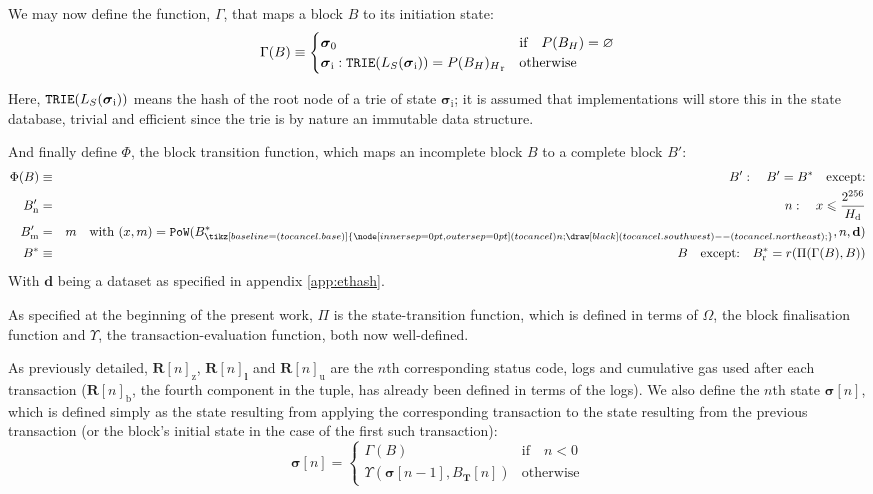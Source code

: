 \documentclass[9pt,oneside]{amsart}
\newcommand{\hcancel}[1]{%
    \tikz[baseline=(tocancel.base)]{
        \node[inner sep=0pt,outer sep=0pt] (tocancel) {#1};
        \draw[black] (tocancel.south west) -- (tocancel.north east);
    }%
}%
\begin{document}
\begin{multicols}{2}
\hypertarget{Gamma}{}We may now define the function, $\Gamma$, that maps a block $B$ to its initiation state:
\begin{equation}
\Gamma(B) \equiv \begin{cases}
\boldsymbol{\sigma}_0 & \text{if} \quad P(B_{H}) = \varnothing \\
\boldsymbol{\sigma}_{\mathrm{i}}: \mathtt{\small TRIE}(L_{S}(\boldsymbol{\sigma}_{\mathrm{i}})) = {P(B_{H})_{H}}_{\mathrm{r}} & \text{otherwise}
\end{cases}
\end{equation}

Here, $\mathtt{\small TRIE}(L_{S}(\boldsymbol{\sigma}_{\mathrm{i}}))$ means the hash of the root node of a trie of state $\boldsymbol{\sigma}_{\mathrm{i}}$; it is assumed that implementations will store this in the state database, trivial and efficient since the trie is by nature an immutable data structure.

\hypertarget{Phi}{}And finally define $\Phi$, the block transition function, which maps an incomplete block $B$ to a complete block $B'$:
\begin{eqnarray}
\Phi(B) & \equiv & B': \quad B' = B^* \quad \text{except:} \\
B'_{\mathrm{n}} & = & n: \quad x \leqslant \frac{2^{256}}{H_{\mathrm{d}}} \\
B'_{\mathrm{m}} & = & m \quad \text{with } (x, m) = \mathtt{PoW}(B^*_{\hcancel{n}}, n, \mathbf{d}) \\
B^* & \equiv & B \quad \text{except:} \quad B^*_{\mathrm{r}} = r(\Pi(\Gamma(B), B))
\end{eqnarray}
With $\mathbf{d}$ being a dataset as specified in appendix \ref{app:ethash}.

As specified at the beginning of the present work, $\Pi$ is the state-transition function, which is defined in terms of $\Omega$, the block finalisation function and \hyperlink{Upsilon_state_transition}{$\Upsilon$}, the transaction-evaluation function, both now well-defined.

As previously detailed, $\mathbf{R}[n]_{\mathrm{z}}$, $\mathbf{R}[n]_{\mathbf{l}}$ and $\mathbf{R}[n]_{\mathrm{u}}$ are the $n$th corresponding status code, logs and cumulative gas used after each transaction ($\mathbf{R}[n]_{\mathrm{b}}$, the fourth component in the tuple, has already been defined in terms of the logs). We also define the $n$th state $\boldsymbol{\sigma}[n]$, which is defined simply as the state resulting from applying the corresponding transaction to the state resulting from the previous transaction (or the block's initial state in the case of the first such transaction):
\begin{equation}
\boldsymbol{\sigma}[n] = \begin{cases} \Gamma(B) & \text{if} \quad n < 0 \\ \Upsilon(\boldsymbol{\sigma}[n - 1], B_{\mathbf{T}}[n]) & \text{otherwise} \end{cases}
\end{equation}


\end{multicols}
\end{document}
